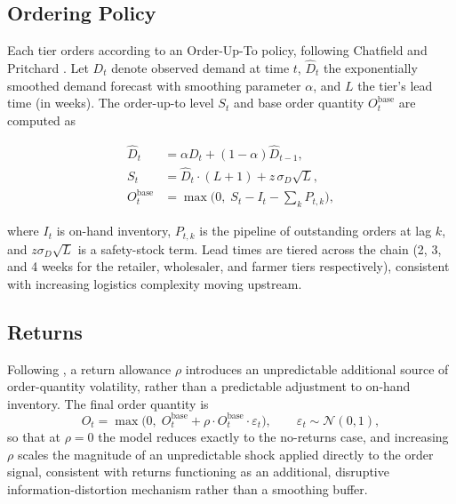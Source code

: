 \documentclass[final,onefignum,onetabnum]{siuro250211}
\begin{document}
\subsection{Ordering Policy}

Each tier orders according to an Order-Up-To policy, following Chatfield and Pritchard
\cite{ChatfieldPritchard2013}. Let $D_t$ denote observed demand at time $t$, $\hat{D}_t$ the
exponentially smoothed demand forecast with smoothing parameter $\alpha$, and $L$ the tier's lead
time (in weeks). The order-up-to level $S_t$ and base order quantity $O_t^{\text{base}}$ are
computed as

\begin{subequations}
\begin{align}
\hat{D}_t &= \alpha D_t + (1-\alpha)\hat{D}_{t-1}, \label{eq:forecast}\\
S_t &= \hat{D}_t \cdot (L + 1) + z\,\sigma_{D}\sqrt{L}, \label{eq:orderupto}\\
O_t^{\text{base}} &= \max\big(0,\; S_t - I_t - \textstyle\sum_{k} P_{t,k}\big), \label{eq:orderqty}
\end{align}
\end{subequations}

where $I_t$ is on-hand inventory, $P_{t,k}$ is the pipeline of outstanding orders at lag $k$, and
$z\sigma_D\sqrt{L}$ is a safety-stock term. Lead times are tiered across the chain (2, 3, and 4
weeks for the retailer, wholesaler, and farmer tiers respectively), consistent with increasing
logistics complexity moving upstream.

\subsection{Returns}

Following \cite{ChatfieldPritchard2013}, a return allowance $\rho$ introduces an unpredictable
additional source of order-quantity volatility, rather than a predictable adjustment to on-hand
inventory. The final order quantity is
\begin{equation}
O_t = \max\big(0,\; O_t^{\text{base}} + \rho \cdot O_t^{\text{base}} \cdot \varepsilon_t\big),
\qquad \varepsilon_t \sim \mathcal{N}(0,1),
\label{eq:returns}
\end{equation}
so that at $\rho=0$ the model reduces exactly to the no-returns case, and increasing $\rho$ scales
the magnitude of an unpredictable shock applied directly to the order signal, consistent with
returns functioning as an additional, disruptive information-distortion mechanism rather than a
smoothing buffer.
\end{document}
